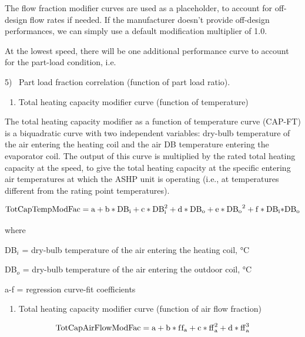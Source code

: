 The flow fraction modifier curves are used as a placeholder, to account for off-design flow rates if needed. If the manufacturer doesn't provide off-design performances, we can simply use a default modification multiplier of 1.0.

At the lowest speed, there will be one additional performance curve to account for the part-load condition, i.e.

5)~ Part load fraction correlation (function of part load ratio).

\begin{enumerate}
\def\labelenumi{\arabic{enumi})}
\tightlist
\item
  Total heating capacity modifier curve (function of temperature)
\end{enumerate}

The total heating capacity modifier as a function of temperature curve (CAP-FT) is a biquadratic curve with two independent variables: dry-bulb temperature of the air entering the heating coil and the air DB temperature entering the evaporator coil. The output of this curve is multiplied by the rated total heating capacity at the speed, to give the total heating capacity at the specific entering air temperatures at which the ASHP unit is operating (i.e., at temperatures different from the rating point temperatures).

\begin{equation}
{\rm{TotCapTempModFac}} = {\rm{a}} + {\rm{b*D}}{{\rm{B}}_{\rm{i}}} + {\rm{c*DB}}_{\rm{i}}^2 + {\rm{d*D}}{{\rm{B}}_{\rm{o}}} + {\rm{e*D}}{{\rm{B}}_{\rm{o}}}^2 + {\rm{f*D}}{{\rm{B}}_{\rm{i}}}{\rm{*D}}{{\rm{B}}_{\rm{o}}}
\end{equation}

where

DB\(_{i}\) = dry-bulb temperature of the air entering the heating coil, °C

DB\(_{o}\) = dry-bulb temperature of the air entering the outdoor coil, °C

a-f = regression curve-fit coefficients

\begin{enumerate}
\def\labelenumi{\arabic{enumi})}
\setcounter{enumi}{1}
\tightlist
\item
  Total heating capacity modifier curve (function of air flow fraction)
\end{enumerate}

\begin{equation}
{\rm{TotCapAirFlowModFac}} = {\rm{a}} + {\rm{b*f}}{{\rm{f}}_{\rm{a}}} + {\rm{c*ff}}_{\rm{a}}^2 + {\rm{d*ff}}_{\rm{a}}^3
\end{equation}

